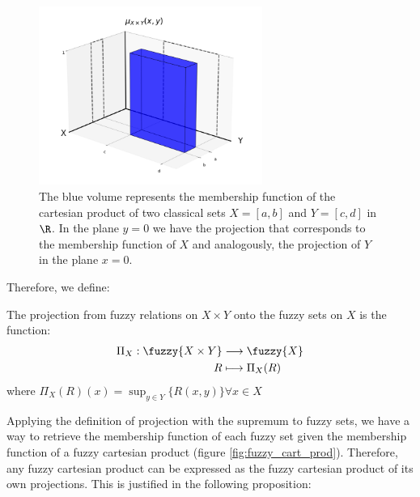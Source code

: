   \begin{figure}[ht]
    \centering
    \includegraphics[width=0.65\textwidth]{ch1/figures/class_cart_prod.png}
    \caption{The blue volume represents the membership function of the cartesian product of two classical sets $X=[a,b]$ and $Y=[c,d]$ in $\R$. In the plane $y=0$ we have the projection that corresponds to the membership function of $X$ and analogously, the projection of $Y$ in the plane $x=0$.}
    \label{fig:class_cart_prod}
  \end{figure}

  Therefore, we define:

  \begin{definition}
    The projection from fuzzy relations on $X\times Y$ onto the fuzzy sets on $X$ is the function:
    \[
      \begin{aligned}
        \Pi_X: \fuzzy{X\times Y} &\longrightarrow \fuzzy{X} \\
        R &\longmapsto \Pi_X(R)
      \end{aligned}
    \]
    where $\Pi_X(R)(x) = \sup_{y\in Y}\{R(x,y)\}\forall x \in X$
  \end{definition}

  Applying the definition of projection with the supremum to fuzzy sets, we have a way to retrieve the membership function of each fuzzy set given the membership function of a fuzzy cartesian product (figure \ref{fig:fuzzy_cart_prod}). Therefore, any fuzzy cartesian product can be expressed as the fuzzy cartesian product of its own projections. This is justified in the following proposition: \\






